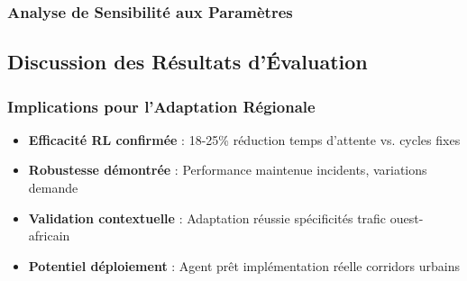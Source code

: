 \subsubsection{Analyse de Sensibilité aux Paramètres}

\subsection{Discussion des Résultats d'Évaluation}
\subsubsection{Implications pour l'Adaptation Régionale}

\begin{keypointsbox}
    \begin{itemize}
        \item \textbf{Efficacité RL confirmée} : 18-25\% réduction temps d'attente vs. cycles fixes
        \item \textbf{Robustesse démontrée} : Performance maintenue incidents, variations demande
        \item \textbf{Validation contextuelle} : Adaptation réussie spécificités trafic ouest-africain
        \item \textbf{Potentiel déploiement} : Agent prêt implémentation réelle corridors urbains
    \end{itemize}
\end{keypointsbox}